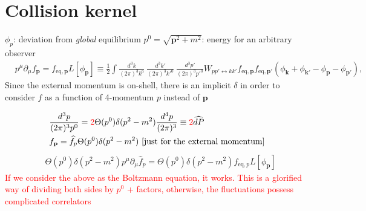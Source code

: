 \documentclass[aps,prd,preprint,nofootinbib,amsmath,amssymb,showpacs,longbibliography,singlecolumn,superscriptaddress,10pt]{revtex4-1}
\theoremstyle{plain}
\theoremstyle{definition}
\begin{document}
\section{Collision kernel}

$\phi_p$: deviation from \textit{global} equilibrium $p^{0} = \sqrt{\textbf{p}^{2} + m^{2}}$: energy for an arbitrary observer 
%
\begin{equation}
\label{Lhat}
\begin{aligned}
&
p^{\mu}\partial_{\mu}f_\textbf{p}
=
f_{\mathrm{eq},\textbf{p}}
L[\phi_{\textbf{p}}] \equiv
\frac{1}{2}\int \frac{d^{3}k}{(2 \pi)^{3} k^{0}} \ \frac{d^{3}k'}{(2 \pi)^{3} k'^{0}} \ \frac{d^{3}p'}{(2 \pi)^{3} p'^{0}}  W_{pp' \leftrightarrow kk'} f_{\mathrm{eq},\textbf{p}} f_{\mathrm{eq},\textbf{p}'} (  \phi_{\textbf{k}} + \phi_{\textbf{k}'} - \phi_{\textbf{p}} - \phi_{\textbf{p}'}  ),
\end{aligned}    
\end{equation}
%
Since the external momentum is on-shell, there is an implicit $\delta$ in order to consider $f$ as a function of 4-momentum $p$ instead of $\textbf{p}$




\begin{equation}
\begin{aligned}
&
\frac{d^{3}p}{(2 \pi)^{3}p^{0}} = \textcolor{red}{2} \Theta(p^{0})\delta(p^{2}-m^{2})\frac{d^{4}p}{(2 \pi)^{3}} \equiv \textcolor{red}{2} \widehat{dP}   
\\
&
f_{\bf p}  = \widehat{f}_{p} \Theta(p^{0})\delta(p^{2}-m^{2}) \text{ 
 [just for the external momentum]}
\end{aligned}   
\end{equation}
%
\begin{equation}
\begin{aligned}
&
\Theta(p^{0})\delta(p^{2}-m^{2})
p^{\mu}\partial_{\mu}\widehat{f}_{p}
=
\Theta(p^{0})\delta(p^{2}-m^{2})
f_{\mathrm{eq},p}
L[\phi_{\textbf{p}}]
\end{aligned}    
\end{equation}
%
\textcolor{red}{If we consider the above as the Boltzmann equation, it works. This is a glorified way of dividing both sides by $p^{0}$ + factors, otherwise, the fluctuations possess complicated correlators}
\end{document}
